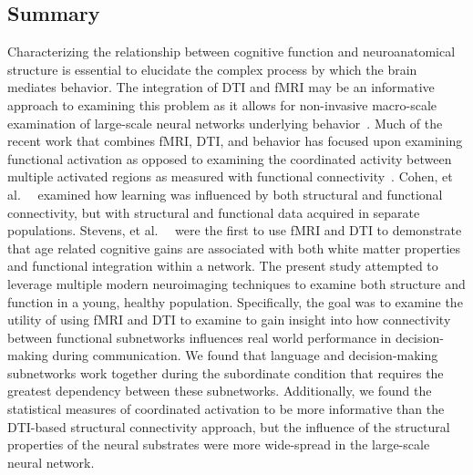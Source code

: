 \subsection{Summary}
Characterizing the relationship between cognitive function and neuroanatomical structure is essential to elucidate the complex process by which the brain mediates behavior. The integration of DTI and fMRI may be an informative approach to examining this problem as it allows for non-invasive macro-scale examination of large-scale neural networks underlying behavior~\cite{Ramnani2004a,Guye2008,Rykhlevskaia2008}. Much of the recent work that combines fMRI, DTI, and behavior has focused upon examining functional activation as opposed to examining the coordinated activity between multiple activated regions as measured with functional connectivity~\cite{Aron2007a,Baird2005,Madden2007,Floel2009,Upadhyay2007}. Cohen, et al.\ ~\cite{Cohen2008a} examined how learning was influenced by both structural and functional connectivity, but with structural and functional data acquired in separate populations. Stevens, et al.\ ~\cite{Stevens2009} were the first to use fMRI and DTI to demonstrate that age related cognitive gains are associated with both white matter properties and functional integration within a network. The present study attempted to leverage multiple modern neuroimaging techniques to examine both structure and function in a young, healthy population. Specifically, the goal was to examine the utility of using fMRI and DTI to examine to gain insight into how connectivity between functional subnetworks influences real world performance in decision-making during communication. We found that language and decision-making subnetworks work together during the subordinate condition that requires the greatest dependency between these subnetworks. Additionally, we found the statistical measures of coordinated activation to be more informative than the DTI-based structural connectivity approach, but the influence of the structural properties of the neural substrates were more wide-spread in the large-scale neural network.

